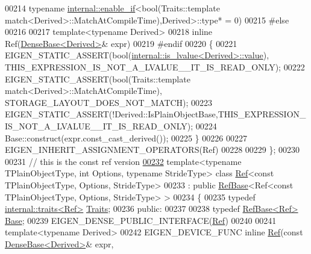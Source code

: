 \begin{DoxyCode}
00214                                  \textcolor{keyword}{typename} \hyperlink{struct_eigen_1_1internal_1_1enable__if}{internal::enable\_if}<\textcolor{keywordtype}{bool}(Traits::template 
      match<Derived>::MatchAtCompileTime),Derived>::type* = 0)
00215     \textcolor{preprocessor}{#else}
00216 
00217     \textcolor{keyword}{template}<\textcolor{keyword}{typename} Derived>
00218     \textcolor{keyword}{inline} Ref(\hyperlink{group___core___module_class_eigen_1_1_dense_base}{DenseBase<Derived>}& expr)
00219     \textcolor{preprocessor}{#endif}
00220     \{
00221       EIGEN\_STATIC\_ASSERT(\textcolor{keywordtype}{bool}(\hyperlink{struct_eigen_1_1internal_1_1is__lvalue}{internal::is\_lvalue<Derived>::value}), 
      THIS\_EXPRESSION\_IS\_NOT\_A\_LVALUE\_\_IT\_IS\_READ\_ONLY);
00222       EIGEN\_STATIC\_ASSERT(\textcolor{keywordtype}{bool}(Traits::template match<Derived>::MatchAtCompileTime), 
      STORAGE\_LAYOUT\_DOES\_NOT\_MATCH);
00223       EIGEN\_STATIC\_ASSERT(!Derived::IsPlainObjectBase,THIS\_EXPRESSION\_IS\_NOT\_A\_LVALUE\_\_IT\_IS\_READ\_ONLY);
00224       Base::construct(expr.const\_cast\_derived());
00225     \}
00226 
00227     EIGEN\_INHERIT\_ASSIGNMENT\_OPERATORS(Ref)
00228 
00229 \};
00230 
00231 \textcolor{comment}{// this is the const ref version}
\hyperlink{class_eigen_1_1_ref_3_01const_01_t_plain_object_type_00_01_options_00_01_stride_type_01_4}{00232} \textcolor{keyword}{template}<\textcolor{keyword}{typename} TPlainObjectType, \textcolor{keywordtype}{int} Options, \textcolor{keyword}{typename} Str\textcolor{keywordtype}{id}eType> \textcolor{keyword}{class }\hyperlink{group___core___module_class_eigen_1_1_ref}{Ref}<const TPlainObjectType, 
      Options, StrideType>
00233   : \textcolor{keyword}{public} \hyperlink{class_eigen_1_1_ref_base}{RefBase}<Ref<const TPlainObjectType, Options, StrideType> >
00234 \{
00235     \textcolor{keyword}{typedef} \hyperlink{struct_eigen_1_1internal_1_1traits}{internal::traits<Ref>} \hyperlink{struct_eigen_1_1internal_1_1traits}{Traits};
00236   \textcolor{keyword}{public}:
00237 
00238     \textcolor{keyword}{typedef} \hyperlink{class_eigen_1_1_ref_base}{RefBase<Ref>} \hyperlink{class_eigen_1_1_ref_base}{Base};
00239     EIGEN\_DENSE\_PUBLIC\_INTERFACE(\hyperlink{group___core___module_class_eigen_1_1_ref}{Ref})
00240 
00241     \textcolor{keyword}{template}<\textcolor{keyword}{typename} Derived>
00242     EIGEN\_DEVICE\_FUNC \textcolor{keyword}{inline} \hyperlink{group___core___module_class_eigen_1_1_ref}{Ref}(\textcolor{keyword}{const} \hyperlink{group___core___module_class_eigen_1_1_dense_base}{DenseBase<Derived>}& expr,

\end{DoxyCode}
